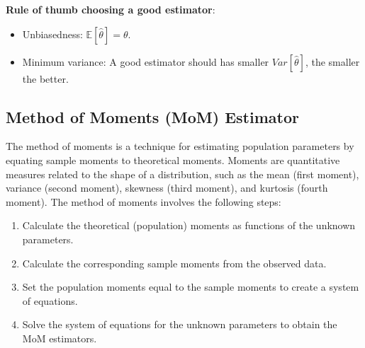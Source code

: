 \textbf{Rule of thumb choosing a good estimator}:
\begin{itemize}
    \item Unbiasedness: $\mathbb{E}[\hat{\theta}] = \theta$.
    \item Minimum variance: A good estimator should has smaller $Var[\hat{\theta}]$, the smaller the better.
\end{itemize}

\subsection{Method of Moments (MoM) Estimator}

The method of moments is a technique for estimating population parameters by equating sample moments to theoretical moments. Moments are quantitative measures related to the shape of a distribution, such as the mean (first moment), variance (second moment), skewness (third moment), and kurtosis (fourth moment).
The method of moments involves the following steps:

\begin{enumerate}
    \item Calculate the theoretical (population) moments as functions of the unknown parameters.
    \item Calculate the corresponding sample moments from the observed data.
    \item Set the population moments equal to the sample moments to create a system of equations.
    \item Solve the system of equations for the unknown parameters to obtain the MoM estimators.
\end{enumerate}

